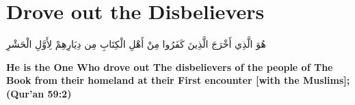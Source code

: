 \chapter{Drove out the Disbelievers}
\begin{center}
    {\Huge    
        \begin{Arabic}
            هُوَ الَّذِي أَخْرَجَ الَّذِينَ كَفَرُوا مِنْ أَهْلِ الْكِتَابِ مِن دِيَارِهِمْ لِأَوَّلِ الْحَشْرِ
        \end{Arabic}
    }
\end{center}
\vspace*{\fill}
\vspace{3cm}
\begin{center}
    \large \textbf{He is the One Who drove out The disbelievers of the people of The Book from their homeland at their First encounter [with the Muslims]; (Qur'an 59:2)}
\end{center}
